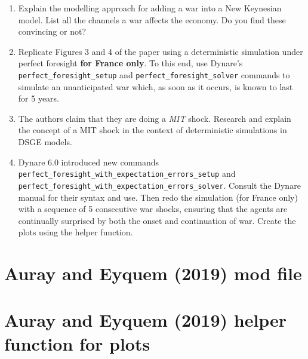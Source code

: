 \documentclass[a4paper]{scrartcl}
\begin{document}
\begin{enumerate}

\item
Explain the modelling approach for adding a war into a New Keynesian model.
List all the channels a war affects the economy.
Do you find these convincing or not?

\item
Replicate Figures 3 and 4 of the paper using a deterministic simulation under perfect foresight \textbf{for France only}.
To this end, use Dynare's \texttt{perfect\_foresight\_setup} and \texttt{perfect\_foresight\_solver} commands
  to simulate an unanticipated war which, as soon as it occurs, is known to last for 5 years.

\item
The authors claim that they are doing a \emph{MIT} shock.
Research and explain the concept of a MIT shock in the context of deterministic simulations in DSGE models.

\item
Dynare 6.0 introduced new commands \texttt{perfect\_foresight\_with\_expectation\_errors\_setup} and \texttt{perfect\_foresight\_with\_expectation\_errors\_solver}.
Consult the Dynare manual for their syntax and use.
Then redo the simulation (for France only) with a sequence of 5 consecutive war shocks, ensuring that the agents are continually surprised by both the onset and continuation of war.
Create the plots using the helper function.
    
\end{enumerate}

\newpage

\appendix

\section{Auray and Eyquem (2019) mod file\label{app:AurayEyquem2019.modfile}}


\section{Auray and Eyquem (2019) helper function for plots\label{app:AurayEyquem2019.plotfile}}

\end{document}
